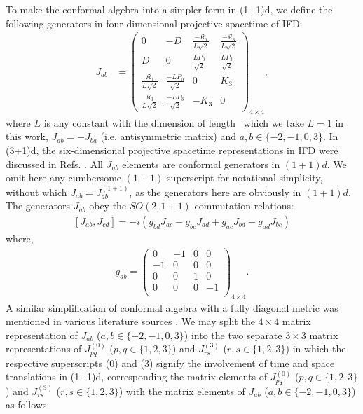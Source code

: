 \documentclass[%
 reprint,
superscriptaddress,
 amsmath,amssymb,
 aps,
]{revtex4-2}
\begin{document}
To make the conformal algebra into a simpler form in (1+1)d, we define the following generators in four-dimensional projective spacetime of IFD:
\begin{align}\label{Jab}
  J_{ab}&=
  \begin{pmatrix}
  0&-D&\frac{-\mathfrak{K}_0}{L\sqrt{2}}&\frac{-\mathfrak{K}_3}{L\sqrt{2}}\\
  D&0&\frac{LP_0}{\sqrt{2}}&\frac{LP_3}{\sqrt{2}}\\
    \frac{\mathfrak{K}_0}{L\sqrt{2}}&\frac{-LP_0}{\sqrt{2}}&0  & K_{3}\\
    \frac{\mathfrak{K}_3}{L\sqrt{2}}&\frac{-LP_3}{\sqrt{2}}&-K_{3} & 0
  \end{pmatrix}_{4\times4},
\end{align}
where $L$ is any constant with the dimension of length~ \cite{Fubini1976} which we take $L=1$ in this work, $J_{ab}=-J_{ba}$ (i.e. antisymmetric matrix) and $a,b\in\{-2,-1,0,3\}$. 
In (3+1)d, the six-dimensional projective spacetime representations in IFD were discussed in Refs. \cite{SalamMack1969, Weinberg_2010}.
All $J_{ab}$ elements are conformal generators in $(1+1)d$. We omit here any cumbersome $(1+1)$ superscript for notational simplicity, without which $J_{ab} = J^{(1+1)}_{ab}$, as the generators here are obviously in $(1+1)d$. The generators $J_{ab}$ obey the $SO(2,1+1)$ commutation relations:
  \begin{align}\label{JabalgebraIFD}
      \left[J_{{a}{b}},J_{{c}{d}}\right]=-i\left(g_{{b}{d}}J_{{a}{c}}-g_{{b}{c}}J_{{a}{d}}+g_{{a}{c}}J_{{b}{d}}-g_{{a}{d}}J_{{b}{c}}\right)
  \end{align}
where, 
  \begin{align}\label{metric}
      g_{ab}=\begin{pmatrix}
  0&-1&0&0\\
  -1&0&0&0\\
  0&0&1&0\\
  0&0&0&-1\\
  \end{pmatrix}_{4\times4}.
  \end{align}
A similar simplification of conformal algebra with a fully diagonal metric was mentioned in various literature sources \cite{SalamMack1969, Francesco}. We may split the $4\times4$ matrix representation of $J_{ab}$ ($a,b\in\{-2,-1,0,3\}$) into the two separate $3\times3$ matrix representations of $J^{(0)}_{pq}$ ($p,q\in\{1,2,3\}$) and $J^{(3)}_{rs}$ ($r,s\in\{1,2,3\}$) in which the respective superscripts (0) and (3) signify the involvement of time and space translations in (1+1)d, corresponding the matrix elements of $J^{(0)}_{pq}$ ($p,q\in\{1,2,3\}$) and $J^{(3)}_{rs}$ ($r,s\in\{1,2,3\}$) with the matrix elements of $J_{ab}$ ($a,b\in\{-2,-1,0,3\}$) as follows:
\end{document}
